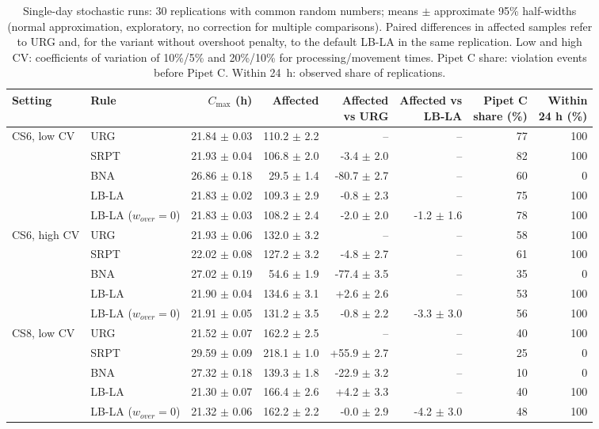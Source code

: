 \begin{table}[tbp]
\caption{Single-day stochastic runs: 30 replications with common random numbers; means $\pm$ approximate 95\% half-widths (normal approximation, exploratory, no correction for multiple comparisons). Paired differences in affected samples refer to URG and, for the variant without overshoot penalty, to the default LB-LA in the same replication. Low and high CV: coefficients of variation of 10\%/5\% and 20\%/10\% for processing/movement times. Pipet C share: violation events before Pipet C. Within 24~h: observed share of replications.\label{tab:stochastic}}
\centering
\footnotesize
\setlength{\tabcolsep}{3pt}
\begin{tabular*}{\textwidth}{@{\extracolsep{\fill}}llrrrrrr@{}}
\toprule
Setting & Rule & $C_{\max}$ (h) & Affected & \shortstack{Affected\\vs URG} & \shortstack{Affected vs\\LB-LA} & \shortstack{Pipet C\\share (\%)} & \shortstack{Within\\24 h (\%)}\\
\midrule
CS6, low CV & URG & 21.84 $\pm$ 0.03 & 110.2 $\pm$ 2.2 & -- & -- & 77 & 100\\
 & SRPT & 21.93 $\pm$ 0.04 & 106.8 $\pm$ 2.0 & -3.4 $\pm$ 2.0 & -- & 82 & 100\\
 & BNA & 26.86 $\pm$ 0.18 & 29.5 $\pm$ 1.4 & -80.7 $\pm$ 2.7 & -- & 60 & 0\\
 & LB-LA & 21.83 $\pm$ 0.02 & 109.3 $\pm$ 2.9 & -0.8 $\pm$ 2.3 & -- & 75 & 100\\
 & LB-LA ($w_{over}=0$) & 21.83 $\pm$ 0.03 & 108.2 $\pm$ 2.4 & -2.0 $\pm$ 2.0 & -1.2 $\pm$ 1.6 & 78 & 100\\
\midrule
CS6, high CV & URG & 21.93 $\pm$ 0.06 & 132.0 $\pm$ 3.2 & -- & -- & 58 & 100\\
 & SRPT & 22.02 $\pm$ 0.08 & 127.2 $\pm$ 3.2 & -4.8 $\pm$ 2.7 & -- & 61 & 100\\
 & BNA & 27.02 $\pm$ 0.19 & 54.6 $\pm$ 1.9 & -77.4 $\pm$ 3.5 & -- & 35 & 0\\
 & LB-LA & 21.90 $\pm$ 0.04 & 134.6 $\pm$ 3.1 & +2.6 $\pm$ 2.6 & -- & 53 & 100\\
 & LB-LA ($w_{over}=0$) & 21.91 $\pm$ 0.05 & 131.2 $\pm$ 3.5 & -0.8 $\pm$ 2.2 & -3.3 $\pm$ 3.0 & 56 & 100\\
\midrule
CS8, low CV & URG & 21.52 $\pm$ 0.07 & 162.2 $\pm$ 2.5 & -- & -- & 40 & 100\\
 & SRPT & 29.59 $\pm$ 0.09 & 218.1 $\pm$ 1.0 & +55.9 $\pm$ 2.7 & -- & 25 & 0\\
 & BNA & 27.32 $\pm$ 0.18 & 139.3 $\pm$ 1.8 & -22.9 $\pm$ 3.2 & -- & 10 & 0\\
 & LB-LA & 21.30 $\pm$ 0.07 & 166.4 $\pm$ 2.6 & +4.2 $\pm$ 3.3 & -- & 40 & 100\\
 & LB-LA ($w_{over}=0$) & 21.32 $\pm$ 0.06 & 162.2 $\pm$ 2.2 & -0.0 $\pm$ 2.9 & -4.2 $\pm$ 3.0 & 48 & 100\\
\bottomrule
\end{tabular*}
\end{table}
